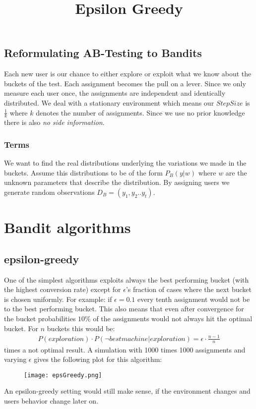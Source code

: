 \documentclass[main.tex]{subfiles}
\begin{document}
\subsection{Reformulating AB-Testing to Bandits}
Each new user is our chance to either explore or exploit what we know about the buckets of the test. Each assignment becomes the pull on a lever. Since we only measure each user once, the assignments are independent and identically distributed. We deal with a stationary environment which means our $StepSize$ is $\frac{1}{k}$ where $k$ denotes the number of assignments. Since we use no prior knowledge there is also \emph{no side information}. 
\subsubsection{Terms}
We want to find the real distributions underlying the variations we made in the buckets. Assume this distributions to be of the form $P_B(y|w)$ where $w$ are the unknown parameters that describe the distribution. By assigning users we generate random observations $D_B=(y_1,y_2..y_t)$.

\section{Bandit algorithms}
\subsection{epsilon-greedy}
One of the simplest algorithms exploits always the best performing bucket (with the highest conversion rate) except for $\epsilon $'s fraction of cases where the next bucket is chosen uniformly. For example: if $\epsilon = 0.1$ every tenth assignment would not be to the best performing bucket. This also means that even after convergence for the bucket probabilities $10\%$ of the assignments would not always hit the optimal bucket. For $n$ buckets this would be:
\begin{align*}
P(exploration) \cdot P(\neg best machine | exploration) = \epsilon \cdot \frac{n-1}{n}
\end{align*}
times a not optimal result. A simulation with 1000 times 1000 assignments and varying $\epsilon$ gives the following plot for this algorithm:
\begin{figure}[ht]
\texttt{[image: epsGreedy.png]}
\centering
\title{Epsilon Greedy}
\end{figure}
An epsilon-greedy setting would still make sense, if the environment changes and users behavior change later on.
\end{document}
